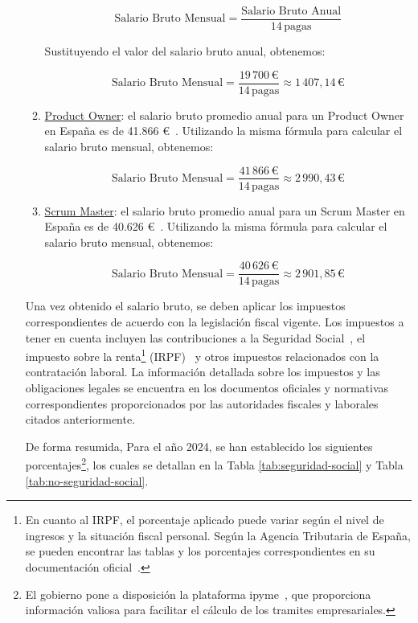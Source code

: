 \begin{enumerate}
\begin{enumerate}
				\[
					\text{{Salario Bruto Mensual}}= \frac{{\text{{Salario Bruto Anual}}}}{{14 \, \text{{pagas}}}}
				\]

				Sustituyendo el valor del salario bruto anual, obtenemos:

				\[
					\text{{Salario Bruto Mensual}}= \frac{{19\,700 \,\text{{€}}}}{{14 \,\text{{pagas}}}}
					\approx 1\,407,14 \, \text{{€}}
				\]

			\item \underline{Product Owner}: el salario bruto promedio anual para un Product
				Owner en España es de 41.866 €~\cite{PayScale}. Utilizando la misma
				fórmula para calcular el salario bruto mensual, obtenemos:

				\[
					\text{{Salario Bruto Mensual}}= \frac{{41\,866 \, \text{{€}}}}{{14 \, \text{{pagas}}}}
					\approx 2\,990,43 \,\text{{€}}
				\]

			\item \underline{Scrum Master}: el salario bruto promedio anual para un Scrum
				Master en España es de 40.626 €~\cite{PayScale1}. Utilizando la misma
				fórmula para calcular el salario bruto mensual, obtenemos:

				\[
					\text{{Salario Bruto Mensual}}= \frac{{40\,626 \,\text{{€}}}}{{14 \, \text{{pagas}}}}
					\approx 2\,901,85 \,\text{{€}}
				\]
		\end{enumerate}

		Una vez obtenido el salario bruto, se deben aplicar los impuestos
		correspondientes de acuerdo con la legislación fiscal vigente. Los impuestos
		a tener en cuenta incluyen las contribuciones a la Seguridad Social~\cite{Cotización},
		el impuesto sobre la renta\footnote{En cuanto al IRPF, el porcentaje aplicado
		puede variar según el nivel de ingresos y la situación fiscal personal.
		Según la Agencia Tributaria de España, se pueden encontrar las tablas y los porcentajes
		correspondientes en su documentación oficial~\cite{AEAT}.} (IRPF)~\cite{IRPF}
		y otros impuestos relacionados con la contratación laboral. La información
		detallada sobre los impuestos y las obligaciones legales se encuentra en los
		documentos oficiales y normativas correspondientes proporcionados por las
		autoridades fiscales y laborales citados anteriormente.

		De forma resumida, Para el año 2024, se han establecido los siguientes
		porcentajes\footnote{El gobierno pone a disposición la plataforma ipyme~\cite{ipyme},
		que proporciona información valiosa para facilitar el cálculo de los tramites
		empresariales.}, los cuales se detallan en la Tabla
		\ref{tab:seguridad-social} y Tabla \ref{tab:no-seguridad-social}.


\end{enumerate}
